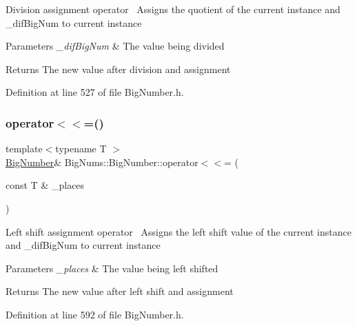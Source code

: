 Division assignment operator~\newline
Assigns the quotient of the current instance and \+\_\+dif\+Big\+Num to current instance 
\begin{DoxyParams}{Parameters}
{\em \+\_\+dif\+Big\+Num} & The value being divided \\
\hline
\end{DoxyParams}
\begin{DoxyReturn}{Returns}
The new value after division and assignment 
\end{DoxyReturn}


Definition at line 527 of file Big\+Number.\+h.

\mbox{\label{class_big_nums_1_1_big_number_a82c0b0b700533df0c96523f5d6fbb2bc}} 
\subsubsection{\texorpdfstring{operator$<$$<$=()}{operator<<=()}}
{\footnotesize\ttfamily template$<$typename T $>$ \\
\mbox{\hyperlink{class_big_nums_1_1_big_number}{Big\+Number}}\& Big\+Nums\+::\+Big\+Number\+::operator$<$$<$= (\begin{DoxyParamCaption}\item[{const T \&}]{\+\_\+places }\end{DoxyParamCaption})\hspace{0.3cm}{\ttfamily [inline]}}

Left shift assignment operator~\newline
Assigns the left shift value of the current instance and \+\_\+dif\+Big\+Num to current instance 
\begin{DoxyParams}{Parameters}
{\em \+\_\+places} & The value being left shifted \\
\hline
\end{DoxyParams}
\begin{DoxyReturn}{Returns}
The new value after left shift and assignment 
\end{DoxyReturn}


Definition at line 592 of file Big\+Number.\+h.

\mbox{\label{class_big_nums_1_1_big_number_abd9a823365d0e1f44b27adb87ce629cc}} 
